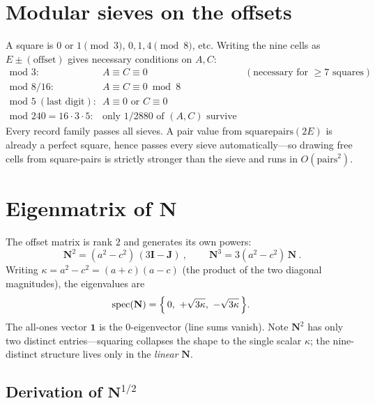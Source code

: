 \documentclass[11pt]{article}
\newcommand{\N}{\mathbf{N}}
\newcommand{\JJ}{\mathbf{J}}
\newcommand{\I}{\mathbf{I}}
\begin{document}
\section{Modular sieves on the offsets}

A square is $0$ or $1\pmod 3$, $0,1,4\pmod 8$, etc. Writing the nine cells as
$E\pm(\text{offset})$ gives necessary conditions on $A,C$:
\[
\begin{array}{lll}
\text{mod }3: & A\equiv C\equiv 0 & (\text{necessary for } \ge 7 \text{ squares})\\
\text{mod }8/16: & A\equiv C\equiv 0 \bmod 8 &\\
\text{mod }5\ (\text{last digit}): & A\equiv 0 \text{ or } C\equiv 0 &\\
\hline
\text{mod }240=16\cdot3\cdot5: & \text{only } 1/2880 \text{ of }(A,C)\text{ survive} &
\end{array}
\]
Every record family passes all sieves. A pair value from
$\mathrm{squarepairs}(2E)$ is already a perfect square, hence passes every
sieve automatically---so drawing free cells from square-pairs is strictly
stronger than the sieve and runs in $O(\text{pairs}^2)$.

\section{Eigenmatrix of $\N$}

The offset matrix is rank $2$ and generates its own powers:
\[
\boxed{\ \N^2=(a^2-c^2)\,(3\I-\JJ)\ },\qquad
\boxed{\ \N^3=3(a^2-c^2)\,\N\ }.
\]
Writing $\kappa=a^2-c^2=(a+c)(a-c)$ (the product of the two diagonal magnitudes),
the eigenvalues are
\[
\operatorname{spec}(\N)=\Bigl\{\,0,\ +\sqrt{3\kappa},\ -\sqrt{3\kappa}\,\Bigr\}.
\]
The all-ones vector $\mathbf 1$ is the $0$-eigenvector (line sums vanish). Note
$\N^2$ has only two distinct entries---squaring collapses the shape to the single
scalar $\kappa$; the nine-distinct structure lives only in the \emph{linear}
$\N$.

\subsection*{Derivation of $\N^{1/2}$}
\end{document}
